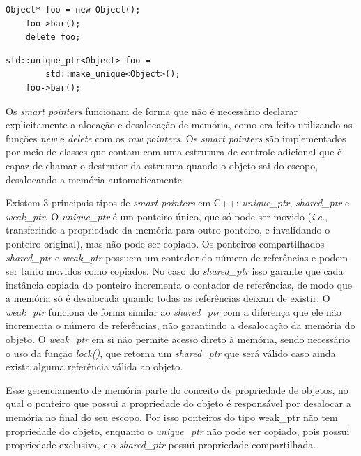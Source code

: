 \noindent
\begin{minipage}{.45\textwidth}
  \begin{lstlisting}[caption = {Uso de \textit{raw pointers}},
    source = {Autoria própria},
    label = {cod:rawptr}]
    Object* foo = new Object();
    foo->bar();
    delete foo;
    \end{lstlisting}
\end{minipage}\hfill
\begin{minipage}{.45\textwidth}
  \begin{lstlisting}[caption = {Uso de \textit{smart pointers}},
    source = {Autoria própria},
    label = {cod:smartptr}]
    std::unique_ptr<Object> foo = 
        std::make_unique<Object>();
    foo->bar();
    \end{lstlisting}
\end{minipage}

Os \textit{smart pointers} funcionam de forma que não é necessário declarar
explicitamente a alocação e desalocação de memória, como era feito utilizando as
funções \textit{new} e \textit{delete} com os \textit{raw pointers}. Os
\textit{smart pointers} são implementados por meio de classes que contam com uma
estrutura de controle adicional que é capaz de chamar o destrutor da estrutura
quando o objeto sai do escopo, desalocando a memória automaticamente.

Existem 3 principais tipos de \textit{smart pointers} em C++:
\textit{unique\_ptr}, \textit{shared\_ptr} e \textit{weak\_ptr}. O
\textit{unique\_ptr} é um ponteiro único, que só pode ser movido (\textit{i.e.},
transferindo a propriedade da memória para outro ponteiro, e invalidando o
ponteiro original), mas não pode ser copiado. Os ponteiros compartilhados
\textit{shared\_ptr} e \textit{weak\_ptr} possuem um contador do número de
referências e podem ser tanto movidos como copiados. No caso do
\textit{shared\_ptr} isso garante que cada instância copiada do ponteiro
incrementa o contador de referências, de modo que a memória só é desalocada
quando todas as referências deixam de existir. O \textit{weak\_ptr} funciona de
forma similar ao \textit{shared\_ptr} com a diferença que ele não incrementa o
número de referências, não garantindo a desalocação da memória do objeto. O
\textit{weak\_ptr} em si não permite acesso direto à memória, sendo necessário o
uso da função \textit{lock()}, que retorna um \textit{shared\_ptr} que será
válido caso ainda exista alguma referência válida ao objeto.

Esse gerenciamento de memória parte do conceito de propriedade de objetos, no
qual o ponteiro que possui a propriedade do objeto é responsável por desalocar a
memória no final do seu escopo. Por isso ponteiros do tipo weak\_ptr não tem
propriedade do objeto, enquanto o \textit{unique\_ptr} não pode ser copiado,
pois possui propriedade exclusiva, e o \textit{shared\_ptr} possui propriedade
compartilhada.


